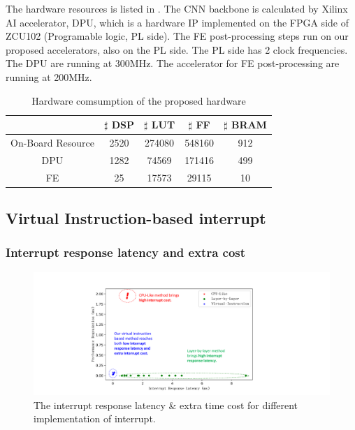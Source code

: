 The hardware resources is listed in . The CNN backbone is calculated by Xilinx AI accelerator, DPU\cite{dpu}, which is a hardware IP implemented on the FPGA side of ZCU102 (Programable logic, PL side). The FE post-processing steps run on our proposed accelerators, also on the PL side. The PL side has 2 clock frequencies. The DPU are running at 300MHz. The accelerator for FE post-processing are running at 200MHz.

\begin{table}[t]
  \centering
  \caption{Hardware comsumption of the proposed hardware}
\begin{tabular}{|c|c|c|c|c|}
  \hline
        & $\sharp$ DSP & $\sharp$ LUT & $\sharp$ FF & $\sharp$ BRAM \bigstrut\\
  \hline
  On-Board Resource &   2520   &  274080      &  548160     & 912 \bigstrut\\
  \hline
  DPU &   1282   &  74569      &   171416    & 499 \bigstrut\\
  \hline
  FE & 25      &  17573     &   29115    & 10 \bigstrut\\
  \hline
  \end{tabular}%
  
  \label{tab:hardware}%
\end{table}%


\subsection{Virtual Instruction-based interrupt }

\subsubsection{ Interrupt response latency and extra cost}

\begin{figure}[t]
  \centering
  \includegraphics[width=0.9\linewidth]{fig/scatter1024.pdf}
  \caption{The interrupt response latency \& extra time cost for different implementation of interrupt. }
  \label{fig:scatter1024}
\end{figure}

